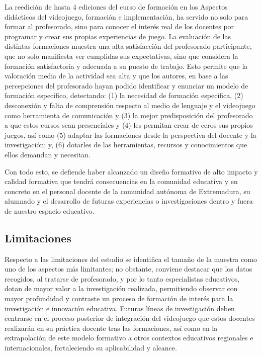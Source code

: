 \documentclass[spanish]{textolivre}
\begin{document}
La reedición de hasta 4 ediciones del curso de formación en los Aspectos didácticos del videojuego, formación e implementación, ha servido no solo para formar al profesorado, sino para conocer el interés real de los docentes por programar y crear sus propias experiencias de juego. La evaluación de las distintas formaciones muestra una alta satisfacción del profesorado participante, que no solo manifiesta ver cumplidas sus expectativas, sino que considera la formación satisfactoria y adecuada a su puesto de trabajo. Esto permite que la valoración media de la actividad sea alta y que los autores, en base a las percepciones del profesorado hayan podido identificar y enunciar un modelo de formación específico, detectando: (1) la necesidad de formación específica, (2) desconexión y falta de comprensión respecto al medio de lenguaje y el videojuego como herramienta de comunicación y (3) la mejor predisposición del profesorado a que estos cursos sean presenciales y (4) les permitan crear de ceros sus propios juegos, así como (5) adaptar las formaciones desde la perspectiva del docente y la investigación; y, (6) dotarles de las herramientas, recursos y conocimientos que ellos demandan y necesitan.

Con todo esto, se defiende haber alcanzado un diseño formativo de alto impacto y calidad formativa que tendrá consecuencias en la comunidad educativa y en concreto en el personal docente de la comunidad autónoma de Extremadura, su alumnado y el desarrollo de futuras experiencias o investigaciones dentro y fuera de nuestro espacio educativo.

\subsection{Limitaciones}\label{sec-quotesandfootnotes}
Respecto a las limitaciones del estudio se identifica el tamaño de la muestra como uno de los aspectos más limitantes; no obstante, conviene destacar que los datos recogidos, al tratarse de profesorado, y por lo tanto especialistas educativos, dotan de mayor valor a la investigación realizada, permitiendo observar con mayor profundidad y contraste un proceso de formación de interés para la investigación e innovación educativa. Futuras líneas de investigación deben centrarse en el proceso posterior de integración del videojuego que estos docentes realizarán en su práctica docente tras las formaciones, así como en la extrapolación de este modelo formativo a otros contextos educativos regionales e internacionales, fortaleciendo su aplicabilidad y alcance.
\end{document}
